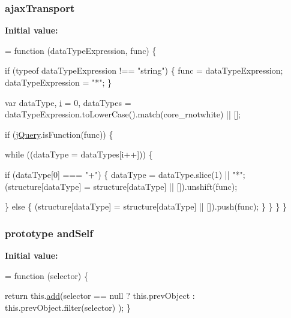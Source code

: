 \subsubsection[{\texorpdfstring{ajax\+Transport}{ajaxTransport}}]{ ajax\+Transport}\hypertarget{jquery-2_82_81-vsdoc_8js_afe3900e3907689b52735b9c2bf0b8ff6}{}\label{jquery-2_82_81-vsdoc_8js_afe3900e3907689b52735b9c2bf0b8ff6}
{\bfseries Initial value\+:}
\begin{DoxyCode}
= \textcolor{keyword}{function} (dataTypeExpression, func) \{
        


        \textcolor{keywordflow}{if} (typeof dataTypeExpression !== \textcolor{stringliteral}{"string"}) \{
            func = dataTypeExpression;
            dataTypeExpression = \textcolor{stringliteral}{"*"};
        \}

        var dataType,
            \hyperlink{geolocation-marker_8js_a0325b7ce0988782a8032e720ef3aa411}{i} = 0,
            dataTypes = dataTypeExpression.toLowerCase().match(core\_rnotwhite) || [];

        \textcolor{keywordflow}{if} (\hyperlink{jquery-2_82_81-vsdoc_8js_add5237586d970a38a81f990e8eb28c6c}{jQuery}.isFunction(func)) \{
            
            \textcolor{keywordflow}{while} ((dataType = dataTypes[i++])) \{
                
                \textcolor{keywordflow}{if} (dataType[0] === \textcolor{stringliteral}{"+"}) \{
                    dataType = dataType.slice(1) || \textcolor{stringliteral}{"*"};
                    (structure[dataType] = structure[dataType] || []).unshift(func);

                    
                \} \textcolor{keywordflow}{else} \{
                    (structure[dataType] = structure[dataType] || []).push(func);
                \}
            \}
        \}
    \}
\end{DoxyCode}
\subsubsection[{\texorpdfstring{and\+Self}{andSelf}}]{ {\bf prototype} and\+Self}\hypertarget{jquery-2_82_81-vsdoc_8js_a2f03fdae45ba09ba33b777405f66b0c4}{}\label{jquery-2_82_81-vsdoc_8js_a2f03fdae45ba09ba33b777405f66b0c4}
{\bfseries Initial value\+:}
\begin{DoxyCode}
= \textcolor{keyword}{function} (selector) \{
        

        \textcolor{keywordflow}{return} this.\hyperlink{jquery-2_82_81-vsdoc_8js_a2f34e089948aad779d5a43c9b381caa6}{add}(selector == null ?
            this.prevObject : this.prevObject.filter(selector)
        );
    \}
\end{DoxyCode}
